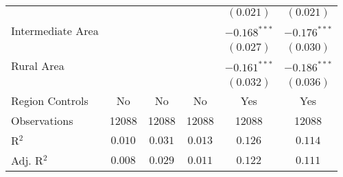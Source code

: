 \begin{center}
\begin{tiny}
\begin{longtable}{l@{} c@{} c@{} c@{} c@{} c@{}}
                                                      &                &                &                & $(0.021)$        & $(0.021)$        \\
\quad Intermediate Area                               &                &                &                & $-0.168^{***}$   & $-0.176^{***}$   \\
                                                      &                &                &                & $(0.027)$        & $(0.030)$        \\
\quad Rural Area                                      &                &                &                & $-0.161^{***}$   & $-0.186^{***}$   \\
                                                      &                &                &                & $(0.032)$        & $(0.036)$        \\
\hline
Region Controls                                       & No             & No             & No             & Yes              & Yes              \\
Observations                                          & 12088          & 12088          & 12088          & 12088            & 12088            \\
R$^2$                                                 & $0.010$        & $0.031$        & $0.013$        & $0.126$          & $0.114$          \\
Adj. R$^2$                                            & $0.008$        & $0.029$        & $0.011$        & $0.122$          & $0.111$          \\
\end{longtable}
\end{tiny}
\end{center}
